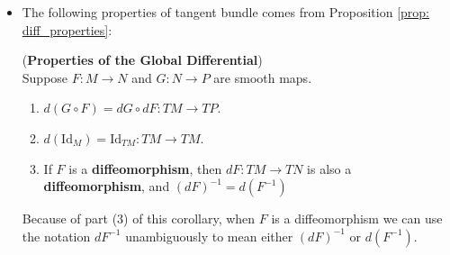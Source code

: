 \documentclass[11pt]{article}
\begin{document}
\begin{itemize}
\item The following properties of tangent bundle comes from Proposition \ref{prop: diff_properties}:
\begin{corollary} (\textbf{Properties of the Global Differential}) \citep{lee2003introduction} \\
Suppose $F: M \rightarrow N$ and $G: N \rightarrow P$ are smooth maps.
\begin{enumerate}
\item $d(G \circ F) = dG \circ dF: TM \rightarrow TP$.
\item $d(\text{Id}_{M}) = \text{Id}_{TM}: TM \rightarrow TM$.
\item If $F$ is a \textbf{diffeomorphism}, then $dF: TM \rightarrow TN$ is also a  \textbf{diffeomorphism}, and
$(dF)^{-1} = d(F^{-1})$
\end{enumerate}
\end{corollary} Because of part (3) of this corollary, when $F$ is a diffeomorphism we can use the
notation $dF^{-1}$ unambiguously to mean either $(dF)^{-1}$ or $d(F^{-1})$.
\end{itemize}
\end{document}
